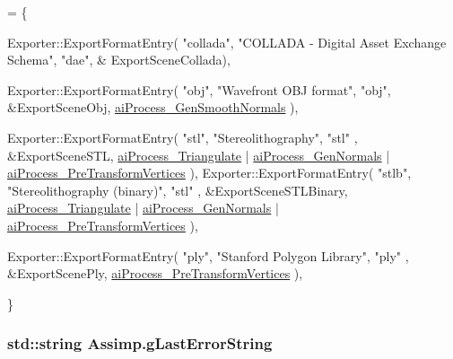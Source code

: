 \begin{DoxyCode}
= 
\{

    Exporter::ExportFormatEntry( \textcolor{stringliteral}{"collada"}, \textcolor{stringliteral}{"COLLADA - Digital Asset Exchange Schema"}, \textcolor{stringliteral}{"dae"}, &
      ExportSceneCollada),



    Exporter::ExportFormatEntry( \textcolor{stringliteral}{"obj"}, \textcolor{stringliteral}{"Wavefront OBJ format"}, \textcolor{stringliteral}{"obj"}, &ExportSceneObj, 
        \hyperlink{postprocess_8h_a64795260b95f5a4b3f3dc1be4f52e410a6afb4fee42eca4482674859196cb8685}{aiProcess\_GenSmoothNormals} ),



    Exporter::ExportFormatEntry( \textcolor{stringliteral}{"stl"}, \textcolor{stringliteral}{"Stereolithography"}, \textcolor{stringliteral}{"stl"} , &ExportSceneSTL, 
        \hyperlink{postprocess_8h_a64795260b95f5a4b3f3dc1be4f52e410a9c3de834f0307f31fa2b1b6d05dd592b}{aiProcess\_Triangulate} | \hyperlink{postprocess_8h_a64795260b95f5a4b3f3dc1be4f52e410a4e0d60129724464915ebc5533a9bba78}{aiProcess\_GenNormals} | 
      \hyperlink{postprocess_8h_a64795260b95f5a4b3f3dc1be4f52e410a6e50fab95214a33996e28fae3efc7582}{aiProcess\_PreTransformVertices}
    ),
    Exporter::ExportFormatEntry( \textcolor{stringliteral}{"stlb"}, \textcolor{stringliteral}{"Stereolithography (binary)"}, \textcolor{stringliteral}{"stl"} , &ExportSceneSTLBinary, 
        \hyperlink{postprocess_8h_a64795260b95f5a4b3f3dc1be4f52e410a9c3de834f0307f31fa2b1b6d05dd592b}{aiProcess\_Triangulate} | \hyperlink{postprocess_8h_a64795260b95f5a4b3f3dc1be4f52e410a4e0d60129724464915ebc5533a9bba78}{aiProcess\_GenNormals} | 
      \hyperlink{postprocess_8h_a64795260b95f5a4b3f3dc1be4f52e410a6e50fab95214a33996e28fae3efc7582}{aiProcess\_PreTransformVertices}
    ),



    Exporter::ExportFormatEntry( \textcolor{stringliteral}{"ply"}, \textcolor{stringliteral}{"Stanford Polygon Library"}, \textcolor{stringliteral}{"ply"} , &ExportScenePly, 
        \hyperlink{postprocess_8h_a64795260b95f5a4b3f3dc1be4f52e410a6e50fab95214a33996e28fae3efc7582}{aiProcess\_PreTransformVertices}
    ),





\}
\end{DoxyCode}
\hypertarget{class_assimp_a00211f6e0485b3428887d17352469e13}{
\subsubsection[{g\+Last\+Error\+String}]{\setlength{\rightskip}{0pt plus 5cm}std\+::string Assimp.\+g\+Last\+Error\+String\hspace{0.3cm}{\ttfamily [static]}}}\label{class_assimp_a00211f6e0485b3428887d17352469e13}
